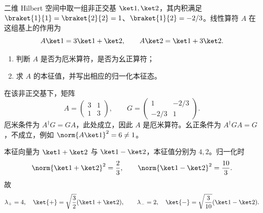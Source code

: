 
\begin{question}
二维 Hilbert 空间中取一组非正交基 $\ket1,\ket2$，其内积满足 $\braket{1}{1}=\braket{2}{2}=1$、$\braket{1}{2}=-2/3$。线性算符 $A$ 在这组基上的作用为
\[
  A\ket1=3\ket1+\ket2,
  \qquad A\ket2=\ket1+3\ket2.
\]
\begin{enumerate}
  \item 判断 $A$ 是否为厄米算符，是否为幺正算符；
  \item 求 $A$ 的本征值，并写出相应的归一化本征态。
\end{enumerate}
\begin{solution}
在该非正交基下，矩阵
\[
  A=\begin{pmatrix}3&1\\1&3\end{pmatrix},
  \qquad G=\begin{pmatrix}1&-2/3\\-2/3&1\end{pmatrix}.
\]
厄米条件为 $A^\dagger G=GA$，此处成立，因此 $A$ 是厄米算符。幺正条件为 $A^\dagger GA=G$，不成立，例如 $\norm{A\ket1}^2=6\ne1$。

本征向量为 $\ket1+\ket2$ 与 $\ket1-\ket2$，本征值分别为 $4,2$。归一化时
\[
  \norm{\ket1+\ket2}^2={2\over3},
  \qquad \norm{\ket1-\ket2}^2={10\over3}.
\]
故
\[
  \lambda_+=4,\quad \ket{+}=\sqrt{3\over2}(\ket1+\ket2),
\qquad
  \lambda_-=2,\quad \ket{-}=\sqrt{3\over10}(\ket1-\ket2).
\]
\end{solution}
\end{question}

